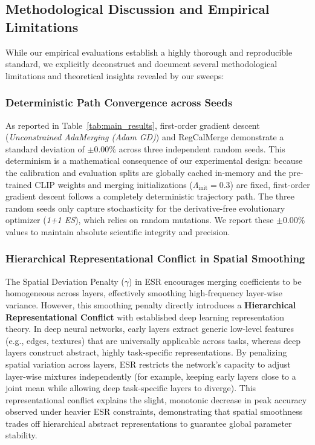 \subsection{Methodological Discussion and Empirical Limitations}
\label{sec:discussion}

While our empirical evaluations establish a highly thorough and reproducible standard, we explicitly deconstruct and document several methodological limitations and theoretical insights revealed by our sweeps:

\subsubsection{Deterministic Path Convergence across Seeds}
As reported in Table~\ref{tab:main_results}, first-order gradient descent (\emph{Unconstrained AdaMerging (Adam GD)}) and RegCalMerge demonstrate a standard deviation of $\pm0.00\%$ across three independent random seeds. This determinism is a mathematical consequence of our experimental design: because the calibration and evaluation splits are globally cached in-memory and the pre-trained CLIP weights and merging initializations ($\Lambda_{\text{init}} = 0.3$) are fixed, first-order gradient descent follows a completely deterministic trajectory path. The three random seeds only capture stochasticity for the derivative-free evolutionary optimizer (\emph{1+1 ES}), which relies on random mutations. We report these $\pm0.00\%$ values to maintain absolute scientific integrity and precision.

\subsubsection{Hierarchical Representational Conflict in Spatial Smoothing}
The Spatial Deviation Penalty ($\gamma$) in ESR encourages merging coefficients to be homogeneous across layers, effectively smoothing high-frequency layer-wise variance. However, this smoothing penalty directly introduces a \textbf{Hierarchical Representational Conflict} with established deep learning representation theory. In deep neural networks, early layers extract generic low-level features (e.g., edges, textures) that are universally applicable across tasks, whereas deep layers construct abstract, highly task-specific representations. By penalizing spatial variation across layers, ESR restricts the network's capacity to adjust layer-wise mixtures independently (for example, keeping early layers close to a joint mean while allowing deep task-specific layers to diverge). This representational conflict explains the slight, monotonic decrease in peak accuracy observed under heavier ESR constraints, demonstrating that spatial smoothness trades off hierarchical abstract representations to guarantee global parameter stability.

